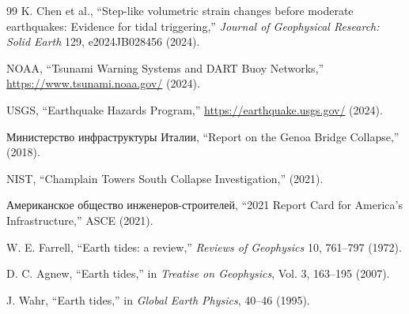 \documentclass[12pt,a4paper]{article}
\theoremstyle{remark}
\begin{document}
\begin{thebibliography}{99}
		K. Chen et al., ``Step-like volumetric strain changes before moderate earthquakes: Evidence for tidal triggering,'' \emph{Journal of Geophysical Research: Solid Earth} 129, e2024JB028456 (2024).
		
		NOAA, ``Tsunami Warning Systems and DART Buoy Networks,'' \url{https://www.tsunami.noaa.gov/} (2024).
		
		USGS, ``Earthquake Hazards Program,'' \url{https://earthquake.usgs.gov/} (2024).
		
		Министерство инфраструктуры Италии, ``Report on the Genoa Bridge Collapse,'' (2018).
		
		NIST, ``Champlain Towers South Collapse Investigation,'' (2021).
		
		Американское общество инженеров-строителей, ``2021 Report Card for America's Infrastructure,'' ASCE (2021).
		
		W. E. Farrell, ``Earth tides: a review,'' \emph{Reviews of Geophysics} 10, 761–797 (1972).
		
		D. C. Agnew, ``Earth tides,'' in \emph{Treatise on Geophysics}, Vol. 3, 163–195 (2007).
		
		J. Wahr, ``Earth tides,'' in \emph{Global Earth Physics}, 40–46 (1995).
		
	\end{thebibliography} 
\end{document}
